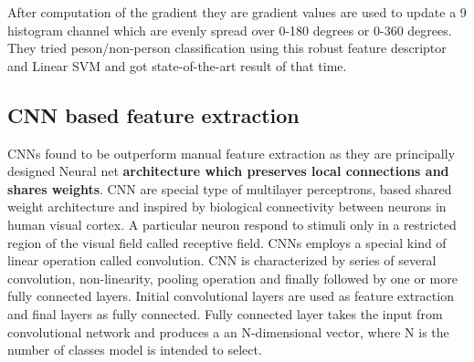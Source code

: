 \newpara After computation of the gradient they are gradient values are used to update a 9 histogram channel which are evenly spread over 0-180 degrees or 0-360 degrees. They tried peson/non-person classification using this robust feature descriptor and Linear SVM and got state-of-the-art result of that time.

\subsection{CNN based feature extraction}
\newpara CNNs found to be outperform manual feature extraction as they are principally designed Neural net \textbf{architecture which preserves local connections and shares weights}. CNN are special type of multilayer perceptrons, based shared weight architecture and inspired by biological connectivity between neurons in human visual cortex. A particular neuron respond to stimuli only in a restricted region of the visual field called receptive field. CNNs employs a special kind of linear operation called convolution. CNN is characterized by series of several convolution, non-linearity, pooling operation and finally followed by one or more fully connected layers. Initial convolutional layers are used as feature extraction and final layers as fully connected. Fully connected layer takes the input from convolutional network and produces a an N-dimensional vector, where N is the number of classes model is intended to select.

